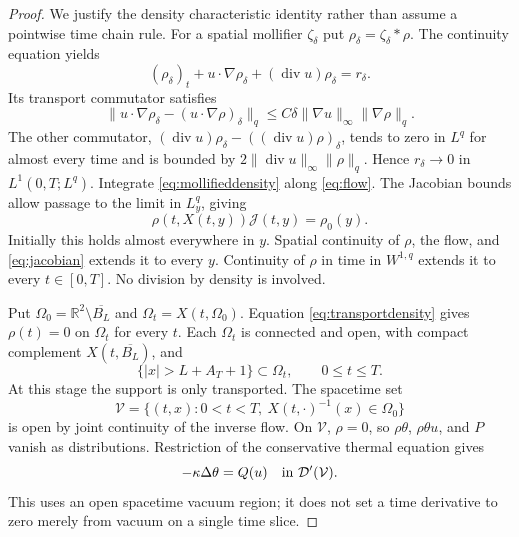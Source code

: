 \documentclass[10pt,twoside]{article}
\newcommand{\R}{\mathbb R}
\newcommand{\Div}{\operatorname{div}}
\newcommand{\norm}[2]{\lVert#1\rVert_{#2}}
\begin{document}
\begin{proof}
We justify the density characteristic identity rather than assume
a pointwise time chain rule. For a spatial mollifier $\zeta_\delta$
put $\rho_\delta=\zeta_\delta*\rho$. The continuity equation yields
\begin{equation}
 (\rho_\delta)_t+u\cdot\nabla\rho_\delta
           +(\Div u)\rho_\delta=r_\delta.
 \label{eq:mollifieddensity}
\end{equation}
Its transport commutator satisfies
\begin{equation}
 \norm{u\cdot\nabla\rho_\delta
               -(u\cdot\nabla\rho)_\delta}{q}
       \le C\delta\norm{\nabla u}{\infty}\norm{\nabla\rho}{q}.
 \label{eq:transportcommutator}
\end{equation}
The other commutator,
$(\Div u)\rho_\delta-((\Div u)\rho)_\delta$, tends to zero in $L^q$
for almost every time and is bounded by
$2\norm{\Div u}{\infty}\norm{\rho}{q}$.
Hence $r_\delta\to0$ in $L^1(0,T;L^q)$.
Integrate \eqref{eq:mollifieddensity} along \eqref{eq:flow}.
The Jacobian bounds allow passage to the limit in $L^q_y$, giving
\begin{equation}
 \rho(t,X(t,y))\mathcal J(t,y)=\rho_0(y).
 \label{eq:transportdensity}
\end{equation}
Initially this holds almost everywhere in $y$. Spatial continuity
of $\rho$, the flow, and \eqref{eq:jacobian} extends it to every $y$.
Continuity of $\rho$ in time in $W^{1,q}$ extends it to every
$t\in[0,T]$. No division by density is involved.

Put $\Omega_0=\R^2\setminus\overline{B_L}$ and
$\Omega_t=X(t,\Omega_0)$. Equation \eqref{eq:transportdensity} gives
$\rho(t)=0$ on $\Omega_t$ for every $t$. Each $\Omega_t$ is connected
and open, with compact complement $X(t,\overline{B_L})$, and
\begin{equation}
 \{|x|>L+A_T+1\}\subset\Omega_t,\qquad 0\le t\le T.
 \label{eq:commonexterior}
\end{equation}
At this stage the support is only transported.
The spacetime set
\[
 \mathcal V=\{(t,x):0<t<T,\ X(t,\cdot)^{-1}(x)\in\Omega_0\}
\]
is open by joint continuity of the inverse flow. On $\mathcal V$,
$\rho=0$, so $\rho\theta$, $\rho\theta u$, and $P$ vanish as
distributions. Restriction of the conservative thermal equation gives
\begin{equation}
 -\kappa\Delta\theta=Q(u)\quad\hbox{in }\mathcal D'(\mathcal V).
 \label{eq:vacuumthermal}
\end{equation}
This uses an open spacetime vacuum region; it does not set a time
derivative to zero merely from vacuum on a single time slice.


\end{proof}
\end{document}
